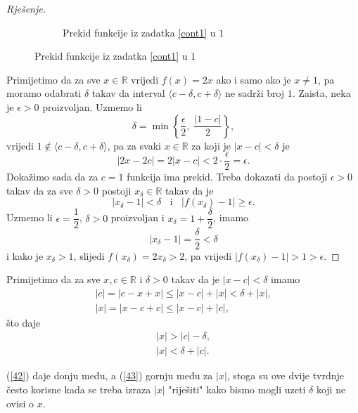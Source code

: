 \begin{proof}[Rješenje]
\begin{figure}[ht]
\begin{subfigure}[t]{.5\textwidth}
\caption{Prekid funkcije iz zadatka \ref{cont1} u \(1\)}
\end{subfigure}
\end{figure}

Primijetimo da za sve \(x\in \mathbb{R}\) vrijedi \(f(x)=2x\) ako i samo ako je \(x\neq 1\), pa moramo odabrati \(\delta\) takav da interval \(\langle c-\delta, c+\delta\rangle\) ne sadrži broj \(1\). Zaista, neka je \(\epsilon>0\) proizvoljan. Uzmemo li \[\delta=\min\left \{\dfrac{\epsilon}{2},\; \dfrac{|1-c|}{2}\right\},\]
vrijedi \(1\notin \langle c-\delta, c+\delta\rangle\), pa za svaki \(x\in \mathbb{R}\) za koji je \(|x-c|<\delta\) je \[|2x-2c|=2|x-c|<2\cdot \dfrac{\epsilon}{2}=\epsilon.\] 
Dokažimo sada da za \(c=1\) funkcija ima prekid. Treba dokazati da postoji \(\epsilon>0\) takav da za sve \(\delta>0\) postoji \(x_\delta\in \mathbb{R}\) takav da je 
\[|x_\delta-1|<\delta\;\;\text{ i }\;\;|f(x_\delta)-1|\geq \epsilon.\] 
Uzmemo li \(\epsilon=\dfrac{1}{2}\), \(\delta>0\) proizvoljan i \(x_\delta=1+\dfrac{\delta}{2}\), imamo 
\[|x_\delta-1|=\dfrac{\delta}{2}<\delta\] 
i kako je \(x_\delta> 1\), slijedi \(f(x_\delta)=2x_\delta>2\), pa vrijedi \(|f(x_\delta)-1|>1> \epsilon\).
\end{proof}
\begin{remark}
Primijetimo da za sve \(x, c\in \mathbb{R}\) i \(\delta>0\) takav da je \(|x-c|<\delta\) imamo
\begin{gather*}
|c|=|c-x+x|\leq |x-c|+|x|<\delta+|x|,\\
|x|=|x-c+c|\leq |x-c|+|c|,
\end{gather*}
što daje
\begin{gather}
\label{42}
|x|>|c|-\delta,\\
\label{43}
|x|<\delta+|c|.
\end{gather}

\noindent (\ref{42}) daje donju među, a (\ref{43}) gornju među za \(|x|\), stoga su ove dvije tvrdnje često korisne kada se treba izraza \(|x|\) "riješiti" kako bismo mogli uzeti \(\delta\) koji ne ovisi o \(x\).
\end{remark}
